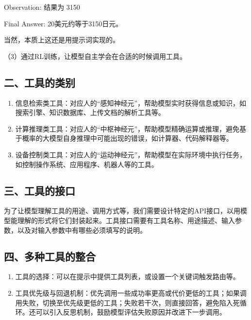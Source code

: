 Observation: 结果为 3150

Final Answer: 20美元约等于3150日元。

当然，本质上这还是用提示词实现的。

（3）通过RL训练，让模型自主学会在合适的时候调用工具。

\hypertarget{ux4e8cux5de5ux5177ux7684ux7c7bux522b}{%
\subsection{二、工具的类别}\label{ux4e8cux5de5ux5177ux7684ux7c7bux522b}}

\begin{enumerate}
\def\labelenumi{\arabic{enumi}.}
\item
  信息检索类工具：对应人的``感知神经元''，帮助模型实时获得信息或知识，如搜索引擎、知识数据库、上传文档的解析工具等。
\item
  计算推理类工具：对应人的``中枢神经元''，帮助模型精确运算或推理，避免基于概率的大模型自身推理中可能出现的错误，如计算器、代码解释器等。
\item
  设备控制类工具：对应人的``运动神经元''，帮助模型在实际环境中执行任务，如控制操作系统、应用程序、机器人等的工具。
\end{enumerate}

\hypertarget{ux4e09ux5de5ux5177ux7684ux63a5ux53e3}{%
\subsection{三、工具的接口}\label{ux4e09ux5de5ux5177ux7684ux63a5ux53e3}}

为了让模型理解工具的用途、调用方式等，我们需要设计特定的API接口，以用模型能理解的形式将它们封装起来。工具接口需要有工具名称、用途描述、输入参数，以及对输入参数中有哪些必须填写的说明。

\hypertarget{ux56dbux591aux79cdux5de5ux5177ux7684ux6574ux5408}{%
\subsection{四、多种工具的整合}\label{ux56dbux591aux79cdux5de5ux5177ux7684ux6574ux5408}}

\begin{enumerate}
\def\labelenumi{\arabic{enumi}.}
\item
  工具的选择：可以在提示中提供工具列表，或设置一个关键词触发路由等。
\item
  工具优先级与回退机制：优先调用一些成功率更高或代价更低的工具；如果调用失败，切换至优先级更低的工具；失败若干次，则直接回答，避免陷入死循环。还可以引入反思机制，鼓励模型评估失败原因并改进下一步调用。
\end{enumerate}

